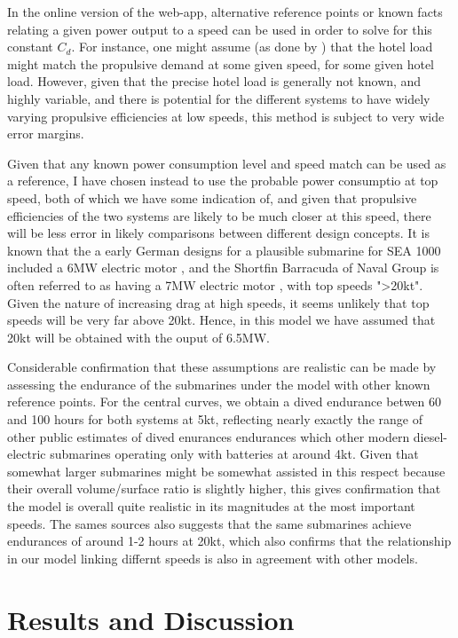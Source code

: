 \documentclass{article}\usepackage[]{graphicx}\usepackage[]{color}
\begin{document}
In the online version of the web-app, alternative reference points or known facts relating a given power output to a speed can be used in order to solve for this constant $C_d$.  For instance, one might assume (as done by \cite{davies2017}) that the hotel load might match the propulsive demand at some given speed, for some given hotel load.  However, given that the precise hotel load is generally not known, and highly variable, and there is potential for the different systems to have widely varying propulsive efficiencies at low speeds, this method is subject to very wide error margins.

Given that any known power consumption level and speed match can be used as a reference, I have chosen instead to use the probable power consumptio at top speed, both of which we have some indication of, and given that propulsive efficiencies of the two systems are likely to be much closer at this speed, there will be less error in likely comparisons between different design concepts.  It is known that the a early German designs for a plausible submarine for SEA 1000 included a 6MW electric motor \parencite{patrick2012}, and the Shortfin Barracuda of Naval Group is often referred to as having a 7MW electric motor \parencite{ohff2017} \parencite{coates2016}, with top speeds ">20kt".  Given the nature of increasing drag at high speeds, it seems unlikely that top speeds will be very far above 20kt. Hence, in this model we have assumed that 20kt will be obtained with the ouput of 6.5MW.

Considerable confirmation that these assumptions are realistic can be made by assessing the endurance of the submarines under the model with other known reference points.  For the central curves, we obtain a dived endurance betwen 60 and 100 hours for both systems at 5kt, reflecting nearly exactly the range of other public estimates of dived enurances endurances which other modern diesel-electric submarines operating only with batteries \parencite[3]{buckingham2008submarine} at around 4kt.  Given that somewhat larger submarines might be somewhat assisted in this respect because their overall volume/surface ratio is slightly higher, this gives confirmation that the model is overall quite realistic in its magnitudes at the most important speeds.  The sames sources also suggests that the same submarines achieve endurances of around 1-2 hours at 20kt, which also confirms that the relationship in our model linking differnt speeds is also in agreement with other models.

\section{Results and Discussion}
\end{document}
